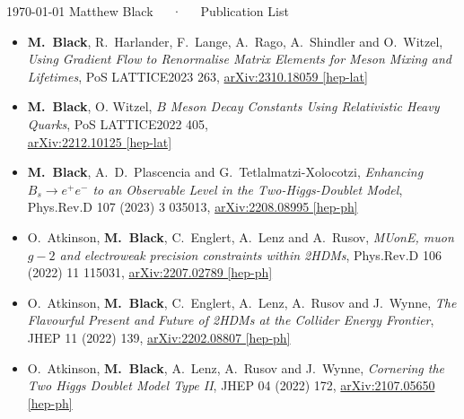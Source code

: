\documentclass[11pt, a4paper]{awesome-cv}
\newcommand{\blue}{\color{awesome-skyblue}}
\begin{document}
\makecvheader[R]

\makecvfooter
  {\today}
  {Matthew Black~~~·~~~Publication List}
  {}


\begin{cvletter}

\begin{itemize}
    \item {\bf M.~Black}, R.~Harlander, F.~Lange, A.~Rago, A.~Shindler and O.~Witzel, {\it Using Gradient Flow to Renormalise Matrix Elements for Meson Mixing and Lifetimes}, PoS LATTICE2023 263, \href{https://arxiv.org/abs/2310.18059}{\blue arXiv:2310.18059 [hep-lat]}
    \item {\bf M.~Black}, O. Witzel, {\it $B$ Meson Decay Constants Using Relativistic Heavy Quarks}, PoS LATTICE2022 405, \\ \href{https://arxiv.org/abs/2212.10125}{\blue arXiv:2212.10125 [hep-lat]}
    \item {\bf M.~Black}, A.~D.~Plascencia and G.~Tetlalmatzi-Xolocotzi, {\it Enhancing $B_s \to e^+ e^-$ to an Observable Level in the Two-Higgs-Doublet Model}, Phys.Rev.D 107 (2023) 3 035013, \href{https://arxiv.org/abs/2208.08995}{\blue arXiv:2208.08995 [hep-ph]}
    \item O.~Atkinson, {\bf M.~Black}, C.~Englert, A.~Lenz and A.~Rusov, {\it MUonE, muon $g-2$ and electroweak precision constraints within 2HDMs}, Phys.Rev.D 106 (2022) 11 115031, \href{https://arxiv.org/abs/2207.02789}{\blue arXiv:2207.02789 [hep-ph]}
    \item O.~Atkinson, {\bf M.~Black}, C.~Englert, A.~Lenz, A.~Rusov and J.~Wynne, {\it The Flavourful Present and Future of 2HDMs at the Collider Energy Frontier}, JHEP 11 (2022) 139, \href{https://arxiv.org/abs/2202.08807}{\blue arXiv:2202.08807 [hep-ph]}
    \item O.~Atkinson, {\bf M.~Black}, A.~Lenz, A.~Rusov and J.~Wynne, {\it Cornering the Two Higgs Doublet Model Type II}, JHEP 04 (2022) 172, \href{https://arxiv.org/abs/2107.05650}{\blue arXiv:2107.05650 [hep-ph]}
\end{itemize}

\end{cvletter}

\end{document}
